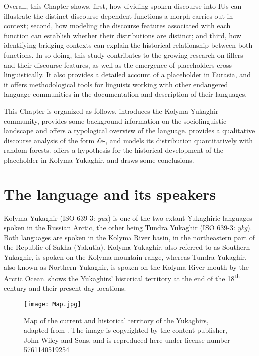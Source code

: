 \documentclass[output=paper,colorlinks,citecolor=brown
\ChapterDOI{10.5281/zenodo.15697581}
]{langscibook}
\begin{document}
Overall, this Chapter shows, first, how dividing spoken discourse into IUs can illustrate the distinct discourse-dependent functions a morph carries out in context; second, how modeling the discourse features associated with each function can establish whether their distributions are distinct; and third, how identifying bridging contexts can explain the historical relationship between both functions. 
In so doing, this study contributes to the growing research on fillers and their discourse features, as well as the emergence of placeholders cross-linguistically.
It also provides a detailed account of a placeholder in Eurasia, and it offers methodological tools for linguists working with other endangered language communities in the documentation and description of their languages. 

This Chapter is organized as follows. 
 introduces the Kolyma Yukaghir community, provides some background information on the sociolinguistic landscape and offers a typological overview of the language.
 provides a qualitative discourse analysis of the form \textit{ʎe}-, and  models its distribution quantitatively with random forests.
 offers a hypothesis for the historical development of the placeholder in Kolyma Yukaghir, and  draws some conclusions.


\section{The language and its speakers} \label{sec_lang}

Kolyma Yukaghir (ISO 639-3: \textit{yux}) is one of the two extant Yukaghiric languages spoken in the Russian Arctic, the other being Tundra Yukaghir (ISO 639-3: \textit{ykg}). 
Both languages are spoken in the Kolyma River basin, in the northeastern part of the Republic of Sakha (Yakutia). 
Kolyma Yukaghir, also referred to as Southern Yukaghir, is spoken on the Kolyma mountain range, whereas Tundra Yukaghir, also known as Northern Yukaghir, is spoken on the Kolyma River mouth by the Arctic Ocean.
 shows the Yukaghirs' historical territory at the end of the 18\textsuperscript{th} century and their present-day locations.

\begin{figure}
\texttt{[image: Map.jpg]}
\caption{Map of the current and historical territory of the Yukaghirs, adapted from \citet{Willerslev2004}. The image is copyrighted by the content publisher, John Wiley and Sons, and is reproduced here under license number 5761140519254}
\label{Map}
\end{figure}   
\end{document}
